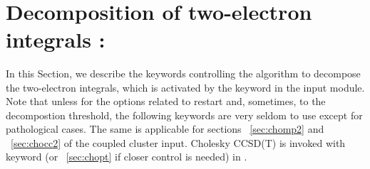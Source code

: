 ~%
\section{Decomposition of two-electron integrals : }\label{sec:choles}
%
%
%

In this Section, we describe the keywords controlling the algorithm to 
decompose the two-electron integrals, which is  activated by the 
keyword  in the  input module. Note that unless
for the options related to restart and, sometimes, to the decompostion
threshold, the following keywords are very seldom
to use except for pathological cases. The same is applicable for sections
~\ref{sec:chomp2} and ~\ref{sec:chocc2} 
of the coupled cluster input. Cholesky CCSD(T)  is
invoked with keyword  (or ~\ref{sec:chopt} if 
closer control is needed) in .



\begin{center}
\end{center}

